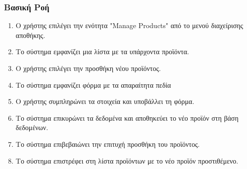 \documentclass[12pt,a4paper,twoside]{book}
\begin{document}
\subsubsection{Βασική Ροή}
\begin{enumerate}
  \item Ο χρήστης επιλέγει την ενότητα "Manage Products" από το μενού διαχείρισης αποθήκης. %
  \item Το σύστημα εμφανίζει μια λίστα με τα υπάρχοντα προϊόντα.
  \item Ο χρήστης επιλέγει την προσθήκη νέου προϊόντος.
  \item Το σύστημα εμφανίζει φόρμα με τα απαραίτητα πεδία %
  \item Ο χρήστης συμπληρώνει τα στοιχεία και υποβάλλει τη φόρμα.
  \item Το σύστημα επικυρώνει τα δεδομένα και αποθηκεύει το νέο προϊόν στη βάση δεδομένων. %
  \item Το σύστημα επιβεβαιώνει την επιτυχή προσθήκη του προϊόντος.
  \item Το σύστημα επιστρέφει στη λίστα προϊόντων με το νέο προϊόν προστιθέμενο.
\end{enumerate}
\end{document}
